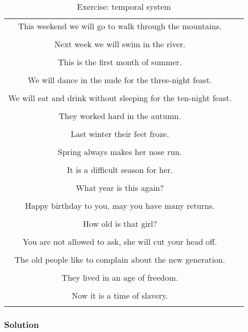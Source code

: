 \begin{table}[H]
\begin{tabular}{|c|M{5.0cm}|}
  \\
  \midrule
  This weekend we will go to walk through the mountains.\\
  \\
  \midrule
  Next week we will swim in the river.\\
  \\
  \midrule
  This is the first month of summer.\\
  \\
  \midrule
  We will dance in the nude for the three-night feast.\\
  \\
  \midrule
  We will eat and drink without sleeping for the ten-night feast.\\
  \\
  \midrule
  They worked hard in the autumn.\\
  \\
  \midrule
  Last winter their feet froze.\\
  \\
  \midrule
  Spring always makes her nose run.\\
  \\
  \midrule
  It is a difficult season for her.\\
  \\
  \midrule
  What year is this again?\\
  \\
  \midrule
  Happy birthday to you, may you have many returns.\\
  \\
  \midrule
  How old is that girl?\\
  \\
  \midrule
  You are not allowed to ask, she will cut your head off.\\
  \\
  \midrule
  The old people like to complain about the new generation.\\
  \\
  \midrule
  They lived in an age of freedom.\\
  \\
  \midrule
  Now it is a time of slavery.\\
  \\
  \bottomrule
\end{tabular}
\label{exercise_temporal_system}
\caption{Exercise: temporal system}
\end{table}

\newpage
\subsubsection{Solution}

